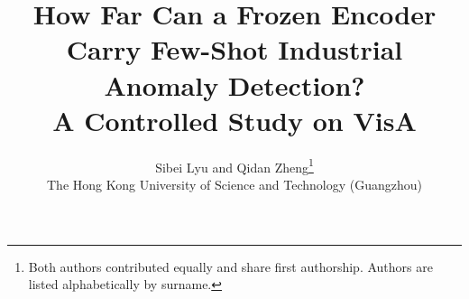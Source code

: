\documentclass[10pt,twocolumn,letterpaper]{article}
\title{How Far Can a Frozen Encoder Carry Few-Shot Industrial Anomaly Detection?\\
A Controlled Study on VisA}
\author{Sibei Lyu and Qidan Zheng\thanks{Both authors contributed equally and share first authorship. Authors are listed alphabetically by surname.}\\
The Hong Kong University of Science and Technology (Guangzhou)}
\begin{document}
\maketitle








{\small


}

\clearpage
\appendix
\onecolumn

\end{document}
